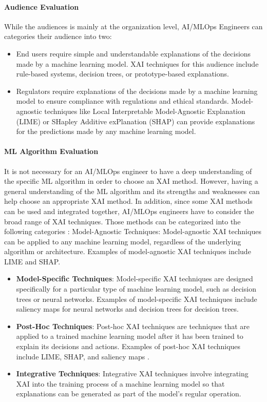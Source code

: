 \documentclass[conference]{IEEEtran}
\begin{document}
\paragraph{Audience Evaluation} While the audiences is mainly at the organization level, AI/MLOps Engineers can categories their audience into two:
\begin{itemize}
\item End users require simple and understandable explanations of the decisions made by a machine learning model. XAI techniques for this audience include rule-based systems, decision trees, or prototype-based explanations.
\item Regulators require explanations of the decisions made by a machine learning model to ensure compliance with regulations and ethical standards. Model-agnostic techniques like Local Interpretable Model-Agnostic Explanation (LIME) \cite{lime} or SHapley Additive exPlanation (SHAP) \cite{shap} can provide explanations for the predictions made by any machine learning model.
\end{itemize}
\paragraph{ML Algorithm Evaluation} It is not necessary for an AI/MLOps engineer to have a deep understanding of the specific ML algorithm in order to choose an XAI method. However, having a general understanding of the ML algorithm and its strengths and weaknesses can help choose an appropriate XAI method. In addition, since some XAI methods can be used and integrated together, AI/MLOps engineers have to consider the broad range of XAI techniques.
Those methods can be categorized into the following categories \cite{XAIREF}:
Model-Agnostic Techniques: Model-agnostic XAI techniques can be applied to any machine learning model, regardless of the underlying algorithm or architecture. Examples of model-agnostic XAI techniques include LIME and SHAP.
\begin{itemize}
	\item \textbf{Model-Specific Techniques}: Model-specific XAI techniques \cite{XAIREF} are designed specifically for a particular type of machine learning model, such as decision trees or neural networks. Examples of model-specific XAI techniques include saliency maps for neural networks and decision trees for decision trees.

	\item \textbf{Post-Hoc Techniques}: Post-hoc XAI techniques \cite{XAIREF} are techniques that are applied to a trained machine learning model after it has been trained to explain its decisions and actions. Examples of post-hoc XAI techniques include LIME, SHAP, and saliency maps \cite{kadir2001saliency}.

	\item \textbf{Integrative Techniques}: Integrative XAI techniques involve integrating XAI into the training process of a machine learning model so that explanations can be generated as part of the model's regular operation.
\end{itemize}
\end{document}
